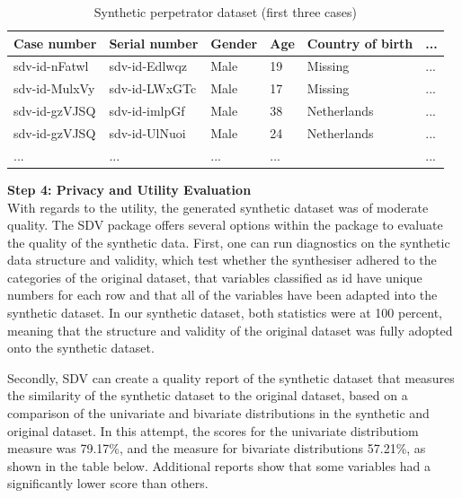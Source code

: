 \vspace{5pt}
\begin{table}[]
\small
\begin{tabular}{@{}llllll@{}}
\toprule
Case number   & Serial number & Gender & Age & Country of birth & ... \\ \midrule
sdv-id-nFatwl & sdv-id-Edlwqz & Male   & 19  & Missing          & ... \\
sdv-id-MulxVy & sdv-id-LWxGTc & Male   & 17  & Missing          & ... \\
sdv-id-gzVJSQ & sdv-id-imlpGf & Male   & 38  & Netherlands      & ... \\
sdv-id-gzVJSQ & sdv-id-UlNuoi & Male   & 24  & Netherlands      & ... \\
...           & ...           & ...    & ... &                  & ... \\ \bottomrule
\end{tabular}
\caption{Synthetic perpetrator dataset (first three cases)}
\label{tab:my-table}
\end{table}
\vspace{10pt}

\textbf{Step 4: Privacy and Utility Evaluation} \\ 
With regards to the utility, the generated synthetic dataset was of moderate quality.
The SDV package offers several options within the package to evaluate the quality of the synthetic data. First, one can run diagnostics on the synthetic data structure and validity, which test whether the synthesiser adhered to the categories of the original dataset, that variables classified as id have unique numbers for each row and that all of the variables have been adapted into the synthetic dataset. In our synthetic dataset, both statistics were at 100 percent, meaning that the structure and validity of the original dataset was fully adopted onto the synthetic dataset.

Secondly, SDV can create a quality report of the synthetic dataset that measures the similarity of the synthetic dataset to the original dataset, based on a comparison of the univariate and bivariate distributions in the synthetic and original dataset. In this attempt, the scores for the univariate distributiom measure was 79.17\%, and the measure for bivariate distributions 57.21\%, as shown in the table below. Additional reports show that some variables had a significantly lower score than others.

